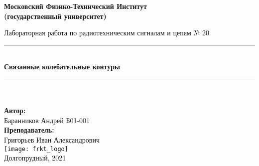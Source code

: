 \newcommand{\HRule}{\rule{\linewidth}{0.7mm}} %
	
	\begin{center}
		\large\textbf{Московский Физико-Технический Институт}\\
		\large\textbf{(государственный университет)}
	
		\vfill
		
		\Large Лабораторная работа по радиотехническим сигналам и цепям № 20\\[0.5cm] %
		
		
		\HRule
		\\[0.4cm]
		{ \huge \bfseries Связанные колебательные контуры}
		\\[0.4cm] %
		\HRule
		\\[0.5cm]
		
		\ \\
	\textbf{\large Автор:} \\	
	\large Баранников Андрей Б01-001\\
	\textbf{\large Преподаватель:} \\
	\large Григорьев Иван Александрович\\
		\vfill
		\hspace*{-0.8 cm}\texttt{[image: frkt\_logo]}\\
		\large Долгопрудный, 2021
	\end{center}

\newpage
\setcounter{page}{2}
\fancyfoot[c]{\thepage}
\fancyhead[R]{}